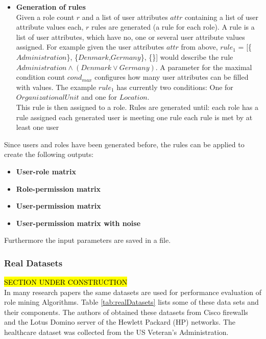 \begin{itemize}
    \item \textbf{Generation of rules}\\
    Given a role count $r$ and a list of user attributes $attr$ containing a list of user attribute values each, $r$ rules are generated (a rule for each role). A rule is a list of user attributes, which have no, one or several user attribute values assigned. For example given the user attributes $attr$ from above, $rule_1$ = [\{$Administration$\}, \{$Denmark$,$Germany$\}, \{\}] would describe the rule $Administration \wedge (Denmark \vee Germany)$. A parameter for the maximal condition count $cond_{max}$ configures how many user attributes can be filled with values. The example $rule_1$ has currently two conditions: One for $OrganizationalUnit$ and one for $Location$.\\
    This rule is then assigned to a role. Rules are generated until:
        \subitem \textbullet \space each role has a rule assigned
        \subitem \textbullet \space each generated user is meeting one rule
        \subitem \textbullet \space each rule is met by at least one user
\end{itemize}
Since users and roles have been generated before, the rules can be applied to create the following outputs:
\begin{itemize}
    \item \textbf{User-role matrix}
    \item \textbf{Role-permission matrix}
    \item \textbf{User-permission matrix}
    \item \textbf{User-permission matrix with noise}
\end{itemize}
Furthermore the input parameters are saved in a file.

\subsubsection{Real Datasets}
\hl{SECTION UNDER CONSTRUCTION}\\
In many research papers the same datasets are used for performance evaluation of role mining Algorithms. Table \ref{tab:realDatasets} lists some of these data sets and their components. The authors of \cite{Ene} obtained these datasets from Cisco firewalls and the Lotus Domino server of the Hewlett Packard (HP) networks. The healthcare dataset was collected from the US Veteran’s Administration.

